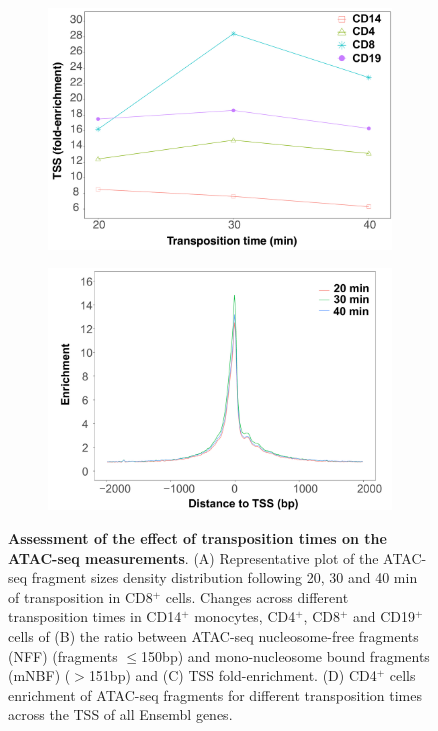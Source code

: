 \begin{figure}[ht]
\begin{subfigure}{0.5\textwidth}
\centering
\includegraphics[width=\textwidth]{./Results1/pdfs/ATAC_TSS_vs_transposition_times}
\caption{\textbf{}} %
\end{subfigure}%
\begin{subfigure}{0.5\textwidth}
	\centering
	\includegraphics[width=\textwidth]{./Results1/pdfs/ATAC_optimisation_CD4_20_30_40_min_tss_enrichment}
	\caption{\textbf{}} %
\end{subfigure}
\caption[Assessment of the effect of transposition times on the ATAC-seq measurements]{\textbf{Assessment of the effect of transposition times on the ATAC-seq measurements}. (A) Representative plot of the ATAC-seq fragment sizes density distribution following 20, 30 and 40 min of transposition in CD8$^+$ cells. Changes across different transposition times in CD14$^+$ monocytes, CD4$^+$, CD8$^+$ and CD19$^+$ cells of (B) the ratio between ATAC-seq nucleosome-free fragments (NFF) (fragments $\leq$150bp) and mono-nucleosome bound fragments (mNBF) ($>$151bp) and (C) TSS fold-enrichment. (D) CD4$^+$ cells enrichment of ATAC-seq fragments for different transposition times across the TSS of all Ensembl genes.}
\label{figure:Transposition_times_ATAC}
\end{figure} 

